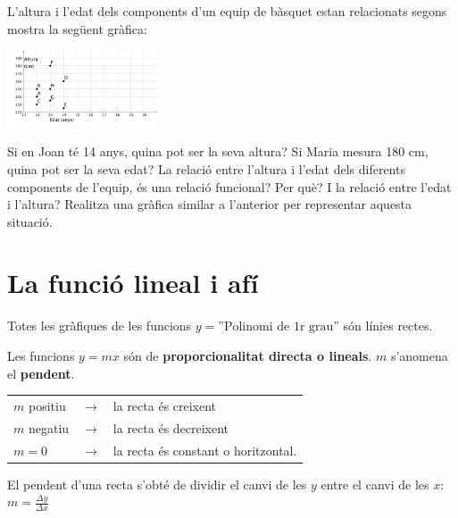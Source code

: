 \begin{mylist}



\exer  L'altura i l'edat dels components d'un equip de bàsquet estan relacionats segons mostra la següent gràfica:

\begin{minipage}{5cm}
	\includegraphics[width=4.5cm]{img-08/graf44}
\end{minipage}
\begin{minipage}{9cm}
	\begin{tasks}
		\task  Si en Joan té 14 anys, quina pot ser la seva altura? 
		\task  Si Maria mesura 180 cm, quina pot ser la seva edat? 
		\task  La relació entre l'altura i l'edat dels diferents components de l'equip, és una relació funcional? Per què?
		\task  I la relació entre l'edat i l'altura? Realitza una gràfica similar a l'anterior per representar aquesta situació.
	\end{tasks}
\end{minipage}
\end{mylist}


\section{La funció lineal i afí}
 

\begin{theorybox}
	

	
 Totes les gràfiques de les funcions $y=\text{''Polinomi de 1r grau''}$ són línies rectes.
 	
 Les funcions $y=mx$ són de \textbf{proporcionalitat directa o lineals}. \linebreak $m$ s'anomena el \textbf{pendent}.
 
 \begin{center}
 \begin{tabular}{lcl}
 	$m$ positiu & $\rightarrow$ & la recta és creixent \\
 	$m$ negatiu & $\rightarrow$  & la recta és decreixent \\
 	$m=0$ & $\rightarrow$  & la recta és constant o horitzontal.
 \end{tabular}
\end{center}

El pendent d'una recta s'obté de dividir el canvi de les $y$ entre el canvi de les $x$: $m=\frac{\Delta y}{\Delta x}$
 
\end{theorybox}

